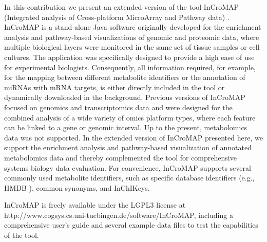 \documentclass[final,5p,times,twocolumn]{elsarticle}
\newcommand\red[1]{{\color{red}#1}}
\begin{document}
In this contribution we present an extended version of the tool InCroMAP \red{(Integrated analysis of Cross-platform MicroArray and Pathway data)} \cite{Wrzodek2012a,Wrzodek2012b}. InCroMAP is a stand-alone Java software originally developed for the enrichment analysis and pathway-based visualizations of genomic and proteomic data, where multiple biological layers were monitored in the same set of \red{tissue samples or cell cultures. The application was specifically designed to provide a high ease of use for experimental biologists}. Consequently, all information required, for example, for the mapping between different metabolite identifiers or the annotation of miRNAs with mRNA targets, is either directly included in the tool or dynamically downloaded in the background. Previous versions of InCroMAP focused on genomics and transcriptomics data and were designed for the combined analysis of a wide variety of omics platform types, where each feature can be linked to a gene or genomic interval. Up to the present, metabolomics data 
was not supported. In the extended version of InCroMAP presented here, we support 
the enrichment analysis and pathway-based visualization of annotated metabolomics data and thereby complemented the tool for comprehensive systems biology data evaluation. For convenience, InCroMAP supports several commonly used metabolite identifiers, such as specific database identifiers (e.g., HMDB \cite{Wishart2009}), common synonyms, and InChIKeys. 

InCroMAP is freely available under the LGPL3 license at http://www.cogsys.cs.uni-tuebingen.de/software/InCroMAP, including a comprehensive user’s guide and several example data files to test the capabilities of the tool.
\end{document}
